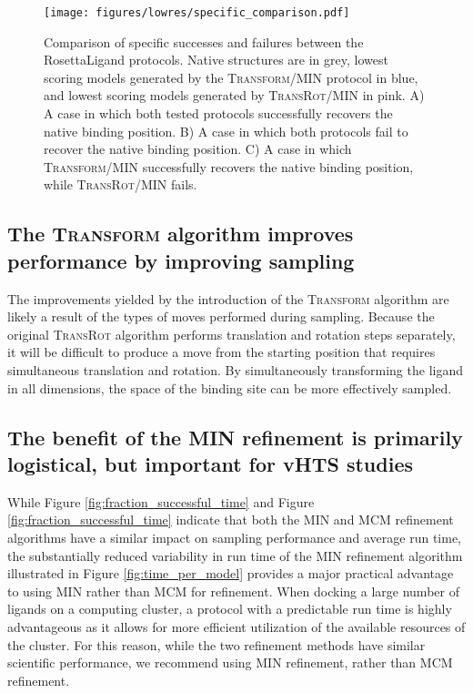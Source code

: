 \begin{figure}
\centering
\texttt{[image: figures/lowres/specific\_comparison.pdf]}
\caption{
Comparison of specific successes and failures between the RosettaLigand protocols.
Native structures are in grey, lowest scoring models generated by the \textsc{Transform}/MIN protocol in blue, and lowest scoring models generated by \textsc{TransRot}/MIN in pink.
A) A case in which both tested protocols successfully recovers the native binding position.
B) A case in which both protocols fail to recover the native binding position. 
C) A case in which \textsc{Transform}/MIN successfully recovers the native binding position, while \textsc{TransRot}/MIN fails.
}
\label{fig:specific_comparison}
\end{figure}

\subsection{The \textsc{Transform} algorithm improves performance by improving sampling}
The improvements yielded by the introduction of the \textsc{Transform} algorithm are likely a result of the types of moves performed during sampling.
Because the original \textsc{TransRot} algorithm performs translation and rotation steps separately, it will be difficult to produce a move from the starting position that requires simultaneous translation and rotation.
By simultaneously transforming the ligand in all dimensions, the space of the binding site can be more effectively sampled. 

\subsection{The benefit of the MIN refinement is primarily logistical, but important for vHTS studies}
While Figure \ref{fig:fraction_successful_time} and Figure \ref{fig:fraction_successful_time} indicate that both the MIN and MCM refinement algorithms have a similar impact on sampling performance and average run time, the substantially reduced variability in run time of the MIN refinement algorithm illustrated in Figure \ref{fig:time_per_model} provides a major practical advantage to using MIN rather than MCM for refinement.
When docking a large number of ligands on a computing cluster, a protocol with a predictable run time is highly advantageous as it allows for more efficient utilization of the available resources of the cluster. 
For this reason, while the two refinement methods have similar scientific performance, we recommend using MIN refinement, rather than MCM refinement. 


